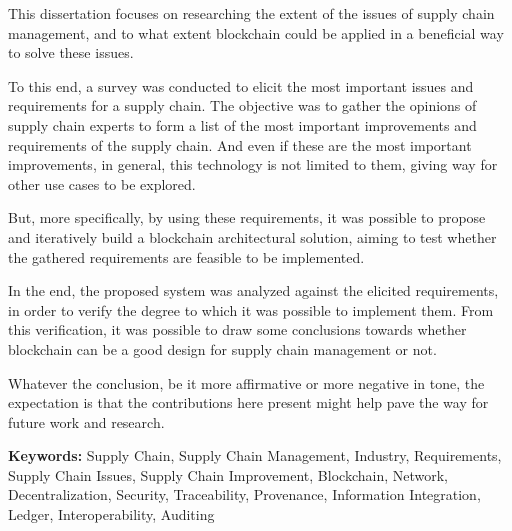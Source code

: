 This dissertation focuses on researching the extent of the issues of supply chain management, and to what extent blockchain could be applied in a beneficial way to solve these issues. 

To this end, a survey was conducted to elicit the most important issues and requirements for a supply chain. The objective was to gather the opinions of supply chain experts to form a list of the most important improvements and requirements of the supply chain. And even if these are the most important improvements, in general, this technology is not limited to them, giving way for other use cases to be explored.

But, more specifically, by using these requirements, it was possible to propose and iteratively build a blockchain architectural solution, aiming to test whether the gathered requirements are feasible to be implemented. 

In the end, the proposed system was analyzed against the elicited requirements, in order to verify the degree to which it was possible to implement them. From this verification, it was possible to draw some conclusions towards whether blockchain can be a good design for supply chain management or not. 

Whatever the conclusion, be it more affirmative or more negative in tone, the expectation is that the contributions here present might help pave the way for future work and research.

\textbf{Keywords:} Supply Chain, Supply Chain Management, Industry, Requirements, Supply Chain Issues, Supply Chain Improvement, Blockchain, Network, Decentralization, Security, Traceability, Provenance, Information Integration, Ledger, Interoperability, Auditing






